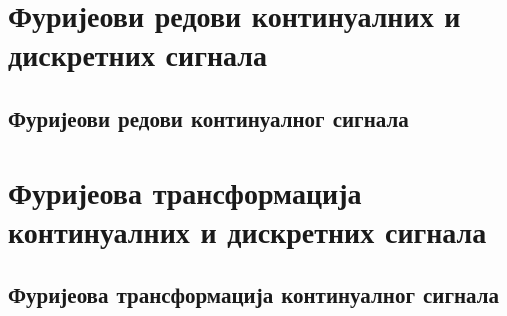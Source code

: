 \setcounter{fid}{0}
\graphicspath{{./1_uvod/2_kontinualni_sistemi/}}
\noindent

\vspace*{\ProblemSep}

\setcounter{fid}{0}
\graphicspath{{./1_uvod/2_kontinualni_sistemi/}}
\noindent

\vspace*{\ProblemSep}

\setcounter{fid}{0}
\graphicspath{{./1_uvod/2_kontinualni_sistemi/}}
\noindent

\vspace*{\ProblemSep}

\setcounter{fid}{0}
\graphicspath{{./1_uvod/2_kontinualni_sistemi/}}
\noindent

\vspace*{\ProblemSep}
\section{Фуријеови редови континуалних и дискретних сигнала}
\subsection{Фуријеови редови континуалног сигнала}

\setcounter{fid}{0}
\graphicspath{{./2_furijeovi_redovi/1_kontinualni/}}
\noindent

\vspace*{\ProblemSep}

\setcounter{fid}{0}
\graphicspath{{./2_furijeovi_redovi/1_kontinualni/}}
\noindent

\vspace*{\ProblemSep}

\setcounter{fid}{0}
\graphicspath{{./2_furijeovi_redovi/1_kontinualni/}}
\noindent

\vspace*{\ProblemSep}
\section{Фуријеова трансформација континуалних и дискретних сигнала}
\subsection{Фуријеова трансформација континуалног сигнала}

